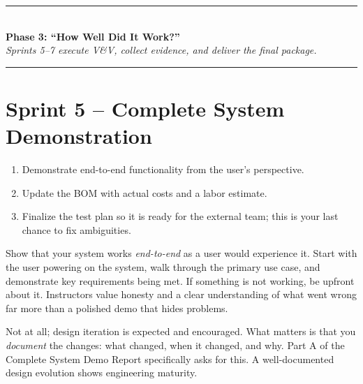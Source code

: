\begin{center}
\textcolor{minesblue}{\rule{0.6\textwidth}{1pt}}\\[4pt]
{\Large\bfseries\sffamily\color{minesblue} Phase 3: ``How Well Did It Work?''}\\[2pt]
{\small\itshape Sprints 5--7 execute V\&V, collect evidence, and deliver the final package.}\\[4pt]
\textcolor{minesblue}{\rule{0.6\textwidth}{1pt}}
\end{center}
\vspace{0.5em}
\section{Sprint 5 -- Complete System Demonstration}

\begin{priorities}
\begin{enumerate}[leftmargin=*, itemsep=1pt, topsep=0pt]
    \item Demonstrate end-to-end functionality from the user's perspective.
    \item Update the BOM with actual costs and a labor estimate.
    \item Finalize the test plan so it is ready for the external team; this is your last chance to fix ambiguities.
\end{enumerate}
\end{priorities}

\begin{faqbox}
Show that your system works \textit{end-to-end} as a user would experience it. Start with the user powering on the system, walk through the primary use case, and demonstrate key requirements being met. If something is not working, be upfront about it. Instructors value honesty and a clear understanding of what went wrong far more than a polished demo that hides problems.
\end{faqbox}

\begin{faqbox}
Not at all; design iteration is expected and encouraged. What matters is that you \textit{document} the changes: what changed, when it changed, and why. Part A of the Complete System Demo Report specifically asks for this. A well-documented design evolution shows engineering maturity.
\end{faqbox}


